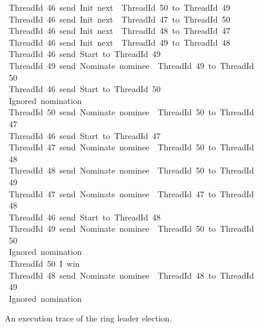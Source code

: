 \documentclass[sigplan,screen]{acmart}
\begin{document}
\begin{figure}[h]
\raggedright
\scriptsize

\begin{tabbing}\ttfamily
~ThreadId~46~send~Init~next~~ThreadId~50~to~ThreadId~49\\
\ttfamily ~ThreadId~46~send~Init~next~~ThreadId~47~to~ThreadId~50\\
\ttfamily ~ThreadId~46~send~Init~next~~ThreadId~48~to~ThreadId~47\\
\ttfamily ~ThreadId~46~send~Init~next~~ThreadId~49~to~ThreadId~48\\
\ttfamily ~ThreadId~46~send~Start~to~ThreadId~49\\
\ttfamily ~ThreadId~49~send~Nominate~nominee~~ThreadId~49~to~ThreadId~50\\
\ttfamily ~ThreadId~46~send~Start~to~ThreadId~50\\
\ttfamily ~Ignored~nomination\\
\ttfamily ~ThreadId~50~send~Nominate~nominee~~ThreadId~50~to~ThreadId~47\\
\ttfamily ~ThreadId~46~send~Start~to~ThreadId~47\\
\ttfamily ~ThreadId~47~send~Nominate~nominee~~ThreadId~50~to~ThreadId~48\\
\ttfamily ~ThreadId~48~send~Nominate~nominee~~ThreadId~50~to~ThreadId~49\\
\ttfamily ~ThreadId~47~send~Nominate~nominee~~ThreadId~47~to~ThreadId~48\\
\ttfamily ~ThreadId~46~send~Start~to~ThreadId~48\\
\ttfamily ~ThreadId~49~send~Nominate~nominee~~ThreadId~50~to~ThreadId~50\\
\ttfamily ~Ignored~nomination\\
\ttfamily ~ThreadId~50~I~win\\
\ttfamily ~ThreadId~48~send~Nominate~nominee~~ThreadId~48~to~ThreadId~49\\
\ttfamily ~Ignored~nomination
\end{tabbing}

\normalsize
\caption{An execution trace of the ring leader election.}
\label{fig:main1-trace}
\end{figure}
\end{document}
